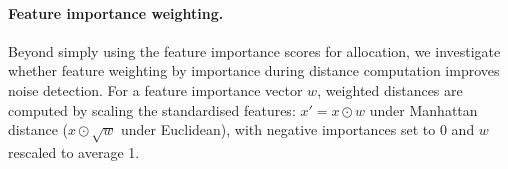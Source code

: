 \paragraph{Feature importance weighting.}

Beyond simply using the feature importance scores for allocation, we investigate whether feature weighting by importance during distance computation improves noise detection. For a feature importance vector $w$, weighted distances are computed by scaling the standardised features: $x' = x \odot w$ under Manhattan distance ($x \odot \sqrt{w}$ under Euclidean), with negative importances set to 0 and $w$ rescaled to average 1. 



